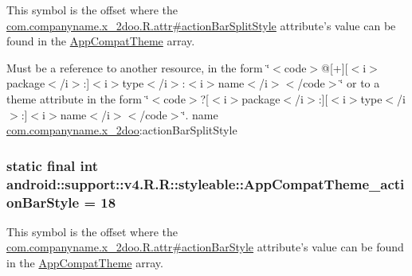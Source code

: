 This symbol is the offset where the \hyperlink{classcom_1_1companyname_1_1x__2doo_1_1_r_1_1attr_ac78bb4aaa982eb4450169fbade228cd}{com.companyname.x\_\-2doo.R.attr\#actionBarSplitStyle} attribute's value can be found in the \hyperlink{classandroid_1_1support_1_1v4_1_1_r_1_1styleable_0873e92ba21076bb5a4aeadeb7f5779f}{AppCompatTheme} array.

Must be a reference to another resource, in the form \char`\"{}$<$code$>$@\mbox{[}+\mbox{]}\mbox{[}$<$i$>$package$<$/i$>$:\mbox{]}$<$i$>$type$<$/i$>$:$<$i$>$name$<$/i$>$$<$/code$>$\char`\"{} or to a theme attribute in the form \char`\"{}$<$code$>$?\mbox{[}$<$i$>$package$<$/i$>$:\mbox{]}\mbox{[}$<$i$>$type$<$/i$>$:\mbox{]}$<$i$>$name$<$/i$>$$<$/code$>$\char`\"{}.  name \hyperlink{namespacecom_1_1companyname_1_1x__2doo}{com.companyname.x\_\-2doo}:actionBarSplitStyle \hypertarget{classandroid_1_1support_1_1v4_1_1_r_1_1styleable_c3f864960381c66a243e748e86583219}{
\subsubsection[{AppCompatTheme\_\-actionBarStyle}]{\setlength{\rightskip}{0pt plus 5cm}static final int android::support::v4.R.R::styleable::AppCompatTheme\_\-actionBarStyle = 18}}
\label{classandroid_1_1support_1_1v4_1_1_r_1_1styleable_c3f864960381c66a243e748e86583219}


This symbol is the offset where the \hyperlink{classcom_1_1companyname_1_1x__2doo_1_1_r_1_1attr_fac08ea086d0d3d0e2249245e5fc058f}{com.companyname.x\_\-2doo.R.attr\#actionBarStyle} attribute's value can be found in the \hyperlink{classandroid_1_1support_1_1v4_1_1_r_1_1styleable_0873e92ba21076bb5a4aeadeb7f5779f}{AppCompatTheme} array.

